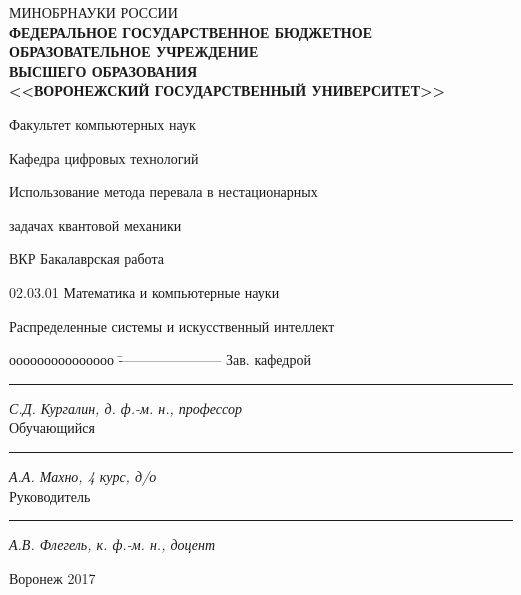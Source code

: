 \documentclass[%
bachelor,    %
natbib,      %
subf,        %
href,        %
colorlinks,  %
]{disser}
\begin{document}
\begin{titlepage}
	
	\thispagestyle{empty}
	\center
	{\small МИНОБРНАУКИ РОССИИ}\\  \!  \!  \!
	{\small \textbf{ФЕДЕРАЛЬНОЕ ГОСУДАРСТВЕННОЕ БЮДЖЕТНОЕ}}\\ \!  \!  \!
	{\small \textbf{ОБРАЗОВАТЕЛЬНОЕ УЧРЕЖДЕНИЕ}}\\ \!  \!
	{\small  \textbf{ВЫСШЕГО ОБРАЗОВАНИЯ}}\\ \!  \!
	{\small \textbf{<<ВОРОНЕЖСКИЙ ГОСУДАРСТВЕННЫЙ УНИВЕРСИТЕТ>>}}\\ \!  \!
	
	\vspace{0.3cm}
	
	\centerline{Факультет компьютерных наук}
	\centerline{Кафедра цифровых технологий}
	
	\vspace{1cm}
	
	\centerline{Использование метода перевала в нестационарных }
	\centerline{задачах квантовой механики}
	
	\vspace{1cm}
	
	\centerline{ВКР Бакалаврская работа}
	\centerline{02.03.01 Математика и компьютерные науки}
	\centerline{Распределенные системы и искусственный интеллект}
	
	\vfill
	\begin{tabbing}
		ооооооооооооооо	\=	----------------------	\kill
		Зав. кафедрой	\> 	\rule[0mm]{4cm}{0,3mm}	\textit{С.Д. Кургалин, д. ф.-м. н., профессор} \\
		Обучающийся 	\> 	\rule[0mm]{4cm}{0,3mm}	\textit{А.А. Махно, 4 курс, д/о}             \\
		Руководитель	\> 	\rule[0mm]{4cm}{0,3mm}  \textit{А.В. Флегель, к. ф.-м. н., доцент} \\

	\end{tabbing}
	
	\vfill
	
	\centerline{Воронеж 2017}
	\clearpage
\end{titlepage}
\end{document}
